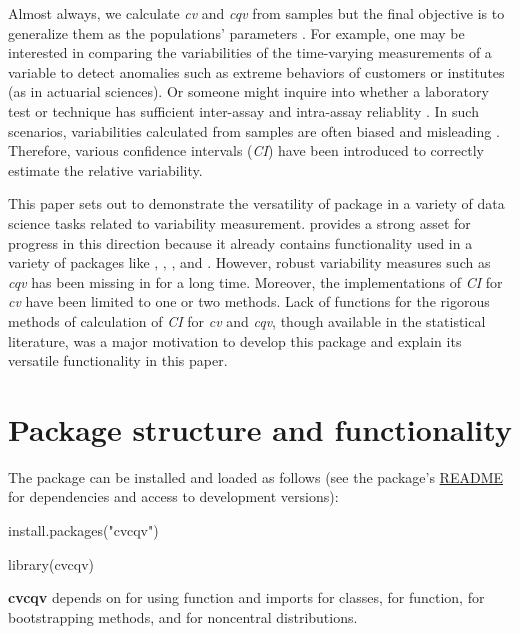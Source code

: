 Almost always, we calculate \emph{cv} and \emph{cqv} from samples but the final objective is to generalize them as the populations' parameters \citep{Albatineh:2014}. For example, one may be interested in comparing the variabilities of the time-varying measurements of a variable to detect anomalies such as extreme behaviors of customers or institutes (as in actuarial sciences). Or someone might inquire into whether a laboratory test or technique has sufficient inter-assay and intra-assay reliablity \citep{Panichkitkosolkul_2013, Payton_1996}. In such scenarios, variabilities calculated from samples are often biased and misleading \citep{sorensen_2002, Payton_1996}. Therefore, various confidence intervals (\emph{CI}) have been introduced to correctly estimate the relative variability. 

This paper sets out to demonstrate the versatility of  package in a variety of data science tasks related to variability measurement.  \citep{R} provides a strong asset for progress in this direction because it already contains functionality used in a variety of packages like , , , and . However, robust variability measures such as \emph{cqv} has been missing in  for a long time. Moreover, the implementations of \emph{CI} for \emph{cv} have been limited to one or two methods. Lack of functions for the rigorous methods of calculation of \emph{CI} for \emph{cv} and \emph{cqv}, though available in the statistical literature, was a major motivation to develop this package and explain its versatile functionality in this paper.  

\section{Package structure and functionality}

The package can be installed and loaded as follows (see the package’s \href{https://github.com/MaaniBeigy/cvcqv/blob/master/README.md}{README} for dependencies and access to development versions):

\begin{example}
install.packages("cvcqv")
\end{example}

\begin{example}
library(cvcqv)
\end{example}

\textbf{cvcqv} depends on  \citep{wickham_2019} for using  function and imports  \citep{chang_2019} for  classes,  \citep{grosjean_2018} for  function,  \citep{canty_2019} for bootstrapping methods, and  \citep{kelley_2018} for noncentral distributions.

